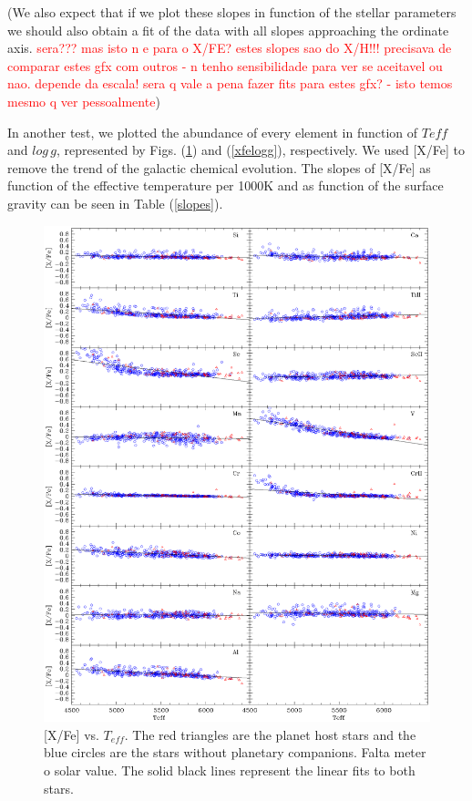 \documentclass[dvips,12pt,a4paper]{report}
\begin{document}
{{(We also expect that if we plot these slopes in function of the stellar parameters we should also obtain a fit of the data with all slopes approaching the ordinate axis. \textcolor{red}{sera??? mas isto n e para o X/FE? estes slopes sao do X/H!!! precisava de comparar estes gfx com outros - n tenho sensibilidade para ver se aceitavel ou nao. depende da escala! sera q vale a pena fazer fits para estes gfx? - isto temos mesmo q ver pessoalmente})

In another test, we plotted the abundance of every element in function of $T{eff}$ and $log\,g$, represented by Figs. (\ref{xfeteff}) and (\ref{xfelogg}), respectively. We used [X/Fe] to remove the trend of the galactic chemical evolution. The slopes of [X/Fe] as function of the effective temperature per 1000K and as function of the surface gravity can be seen in Table (\ref{slopes}).

\begin{figure}[h]
\centering
\includegraphics[width=15 cm]{pics/uncertain/xfeteff.eps}
\caption[depois]{[X/Fe] vs. $T_{eff}$. The red triangles are the planet host stars and the blue circles are the stars without planetary companions. Falta meter o solar value. The solid black lines represent the linear fits to both stars.}
\label{xfeteff}
\end{figure}

}}
\end{document}
